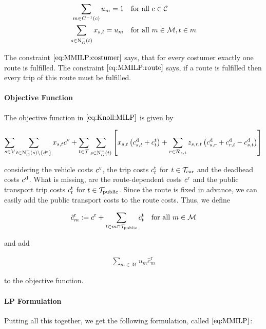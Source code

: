 \begin{align}
	\sum_{m\in C^{-1}(c)} u_m = 1 &&& \text{for all } c\in\mathcal{C} \label{eq:MMILP:costumer} \\
	\sum_{s\in\operatorname{N}_G^-(t)} x_{s,t} = u_m &&& \text{for all } m\in\mathcal{M}, t\in m \label{eq:MMILP:route}
\end{align}

The constraint $\eqref{eq:MMILP:costumer}$ says, that for every costumer exactly one route is fulfilled. The constraint $\eqref{eq:MMILP:route}$ says, if a route is fulfilled then every trip of this route must be fulfilled.

\paragraph{Objective Function} \parfill

The objective function in $\eqref{eq:Knoll:MILP}$ is given by

\begin{align*}
	\sum_{s\in\mathcal{V}} \sum_{t\in\operatorname{N}_G^+(s)\backslash\{d^{\operatorname{e}}\}} x_{s,t}c^{\operatorname{v}}	+ \sum_{t\in\mathcal{T}} \sum_{s\in\operatorname{N}_G^-(t)} \left[x_{s,t}\left(c^{\operatorname{d}}_{s,t}+c^{\operatorname{t}}_{t}\right) + \sum_{r\in\mathcal{R}_{s,t}} z_{s,r,t}\left(c^{\operatorname{d}}_{s,r}+c^{\operatorname{d}}_{r,t}-c^{\operatorname{d}}_{s,t}\right)\right]
\end{align*}

considering the vehicle costs $c^{\operatorname{v}}$, the trip costs $c^{\operatorname{t}}_t$ for $t\in\mathcal{T}_{\operatorname{car}}$ and the deadhead costs $c^{\operatorname{d}}$. What is missing, are the route-dependent costs $c^{\operatorname{r}}$ and the public transport trip costs $c^{\operatorname{t}}_t$ for $t\in\mathcal{T}_{\operatorname{public}}$. Since the route is fixed in advance, we can easily add the public transport costs to the route costs. Thus, we define

\begin{align*}
	\hat{c}^{\operatorname{r}}_m := c^{\operatorname{r}} + \sum_{t\in m\cap\mathcal{T}_{\operatorname{public}}}c^{\operatorname{t}}_t && \text{for all } m\in\mathcal{M}
\end{align*}

and add

\begin{align*}
	\sum_{m\in\mathcal{M}} u_m\hat{c}^{\operatorname{r}}_m
\end{align*}

to the objective function.

\paragraph{LP Formulation} \parfill

Putting all this together, we get the following formulation, called $\eqref{eq:MMILP}$:

